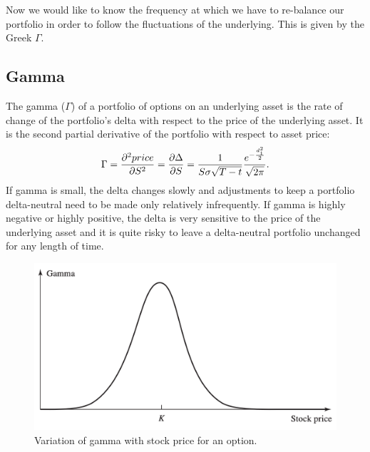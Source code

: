  Now we would like to know the frequency at which we have to re-balance our portfolio in order to follow the fluctuations of the underlying. This is given by the Greek $\Gamma$.

\subsection{Gamma} %
The gamma ($\Gamma$) of a portfolio of options on an underlying asset is the rate of change of the portfolio's delta with respect to the price of the underlying asset. It is the second partial derivative of the portfolio with respect to asset price:
\begin{equation}
    \Gamma = \pdv[2]{price}{S} = \pdv{\Delta}{S} = \dfrac{1}{S\sigma\sqrt{T-t}}\dfrac{e^{-\frac{d_1^2}{2}}}{\sqrt{2\pi}}.
\end{equation}
If gamma is small, the delta changes slowly and adjustments to keep a portfolio delta-neutral need to be made only relatively infrequently. If gamma is highly negative or highly positive, the delta is very sensitive to the price of the underlying asset and it is quite risky to leave a delta-neutral portfolio unchanged for any length of time.
\begin{figure}[htp]
    \centering
    \includegraphics[scale=0.2]{fig/tmp/fig14.png}
    \caption{Variation of gamma with stock price for an option.}
    \label{fig:gamma}
\end{figure}

